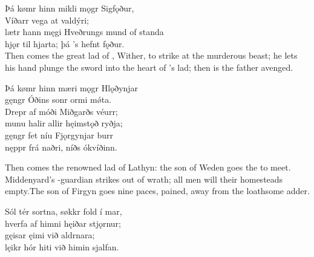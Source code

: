 \bva Þá kømr hinn mikli \hld mǫgr Sigfǫður, \\%
Víðarr vega \hld at valdýri; \\%
lætr hann męgi Hveðrungs \hld mund of standa \\%
hjǫr til hjarta; \hld þá ’s hefnt fǫður.\\%

\bvb Then comes the great lad of , Wither, to strike at the murderous beast; he lets his hand plunge the sword into the heart of ’s lad\footnotemark[1]; then is the father avenged.\\%

\bva Þá kømr hinn mæri \hld mǫgr Hlǫðynjar \\%
gęngr Óðins sonr \hld ormi mǿta. \\%
Drepr af móði \hld Miðgarðs véurr; \\%
munu halir allir \hld hęimstǫð ryðja; \\%
gęngr fet níu \hld Fjǫrgynjar burr \\%
nęppr frá naðri, \hld níðs ókvíðinn.\footnotemark[1]\\%

\bvb Then comes the renowned lad of Lathyn: the son of Weden goes the  to meet. Middenyard’s -guardian strikes out of wrath; all men will their homesteads empty.\footnotemark[1] The son of Firgyn goes nine paces, pained, away from the loathsome adder.\footnotemark[2]\\%

\bva Sól tér sortna, \hld søkkr fold í mar, \\%
hverfa af himni \hld hęiðar stjǫrnur; \\%
gęisar ęimi \hld við aldrnara; \\%
lęikr hór hiti \hld við himin sjalfan.\\%

